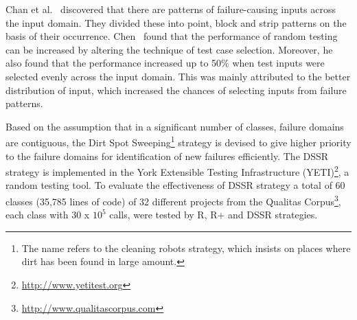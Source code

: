 \documentclass[conference]{IEEEtran}
\begin{document}
\noindent Chan et al.~\cite{Chan1996} discovered that there are patterns of failure-causing inputs across the input domain. They divided these into point, block and strip patterns on the basis of their occurrence. Chen~\cite{Chen2008} found that the performance of random testing can be increased by altering the technique of test case selection. Moreover, he also found that the performance increased up to 50\% when test inputs were selected evenly across the input domain. This was mainly attributed to the better distribution of input, which increased the chances of selecting inputs from failure patterns. 

\noindent Based on the assumption that in a significant number of classes, failure domains are contiguous, the Dirt Spot Sweeping\footnote{The name refers to the cleaning robots strategy, which insists on places where dirt has been found in large amount.} strategy is devised to give higher priority to the failure domains for identification of new failures efficiently. 
The DSSR strategy is implemented in the York Extensible Testing Infrastructure (YETI)\footnote{\url{http://www.yetitest.org}}, a random testing tool. To evaluate the effectiveness of DSSR strategy a total of 60 classes (35,785 lines of code) of 32 different projects from the Qualitas Corpus\footnote{\url{http://www.qualitascorpus.com}}, each class with 30 x ${10^5}$ calls, were tested by R, R+ and DSSR strategies.
\end{document}

